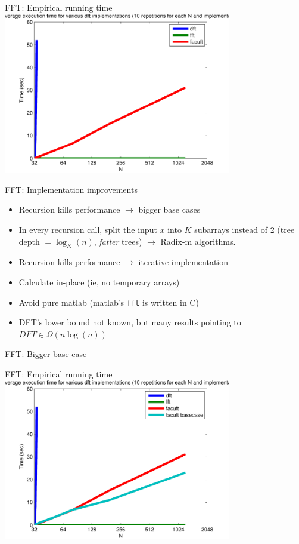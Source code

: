 \begin{myframe}{FFT: Empirical running time}
\centering
\includegraphics[height=200pt]{img/running_time}
\end{myframe}

\begin{myframe}{FFT: Implementation improvements}
\centering
\begin{itemize}
\item Recursion kills performance $\rightarrow$ bigger base cases
\item In every recursion call, split the input $x$ into $K$ subarrays instead of 2 (tree depth $= \log_K(n)$, \textit{fatter} trees) $\rightarrow$ Radix-m algorithms.
\item Recursion kills performance $\rightarrow$ iterative implementation
\item Calculate in-place (ie, no temporary arrays)
\item Avoid pure matlab (matlab's \texttt{fft} is written in C)
\item DFT's lower bound not known, but many results pointing to $DFT \in \Omega(n \log(n))$
\end{itemize}
\end{myframe}

\begin{myframe}{FFT: Bigger base case}
\centering

\end{myframe}

\begin{myframe}{FFT: Empirical running time}
\centering
\includegraphics[height=200pt]{img/running_time_basecase}
\end{myframe}